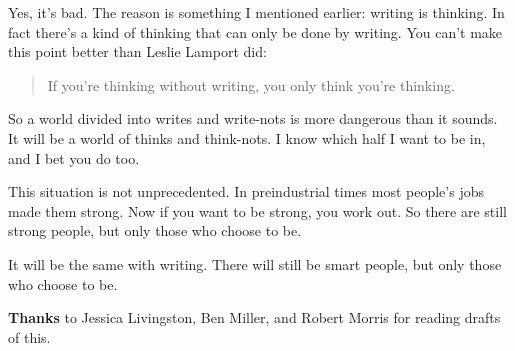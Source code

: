 Yes, it's bad. The reason is something I mentioned earlier: writing is
thinking. In fact there's a kind of thinking that can only be done by
writing. You can't make this point better than Leslie Lamport did:

\begin{quote}
If you're thinking without writing, you only think you're thinking.
\end{quote}

So a world divided into writes and write-nots is more dangerous than it
sounds. It will be a world of thinks and think-nots. I know which half I
want to be in, and I bet you do too.

This situation is not unprecedented. In preindustrial times most
people's jobs made them strong. Now if you want to be strong, you work
out. So there are still strong people, but only those who choose to be.

It will be the same with writing. There will still be smart people, but
only those who choose to be.

\textbf{Thanks} to Jessica Livingston, Ben Miller, and Robert Morris for
reading drafts of this.
